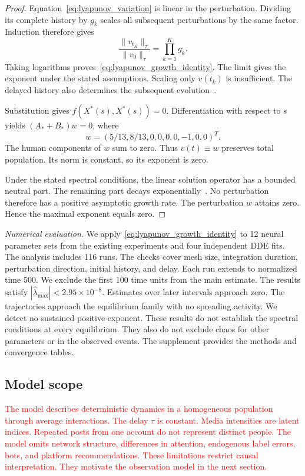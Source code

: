 \documentclass[letterpaper,journal]{IEEEtran}
\begin{document}
\begin{proof}
Equation~\eqref{eq:lyapunov_variation} is linear in the perturbation.
Dividing its complete history by $g_k$ scales all subsequent
perturbations by the same factor.
Induction therefore gives
\[
\frac{\|v_{t_K}\|_\tau}{\|v_0\|_\tau}
=\prod_{k=1}^{K}g_k.
\]
Taking logarithms proves~\eqref{eq:lyapunov_growth_identity}.
The limit gives the exponent under the stated assumptions.
Scaling only $v(t_k)$ is insufficient.
The delayed history also determines the subsequent
evolution~\cite{ansmann2018lyapunov}.

Substitution gives $f(X^*(s),X^*(s))=0$.
Differentiation with respect to $s$ yields
$(A_*+B_*)w=0$, where
\[
w=(5/13,8/13,0,0,0,0,-1,0,0)^T.
\]
The human components of $w$ sum to zero.
Thus $v(t)\equiv w$ preserves total population.
Its norm is constant, so its exponent is zero.

Under the stated spectral conditions, the linear solution
operator has a bounded neutral part.
The remaining part decays exponentially~\cite{hale1993functional}.
No perturbation therefore has a positive asymptotic growth rate.
The perturbation $w$ attains zero.
Hence the maximal exponent equals zero.
\end{proof}

\noindent\textit{Numerical evaluation.}
We apply~\eqref{eq:lyapunov_growth_identity} to
12 neural parameter sets from the existing experiments
and four independent DDE fits.
The analysis includes 116 runs.
The checks cover mesh size, integration duration, perturbation
direction, initial history, and delay.
Each run extends to normalized time 500.
We exclude the first 100 time units from the main estimate.
The results satisfy
$|\widehat\lambda_{\max}|<2.95\times10^{-8}$.
Estimates over later intervals approach zero.
The trajectories approach the equilibrium family with no
spreading activity.
We detect no sustained positive exponent.
These results do not establish the spectral conditions
at every equilibrium.
They also do not exclude chaos for other parameters
or in the observed events.
The supplement provides the methods and convergence tables.
\endgroup

\subsection{Model scope}
\textcolor{red}{
The model describes deterministic dynamics in a homogeneous
population through average interactions.
The delay $\tau$ is constant.
Media intensities are latent indices.
Repeated posts from one account do not represent distinct people.
The model omits network structure, differences in attention,
endogenous label errors, bots, and platform recommendations.
These limitations restrict causal interpretation.
They motivate the observation model in the next section.
}
\end{document}
